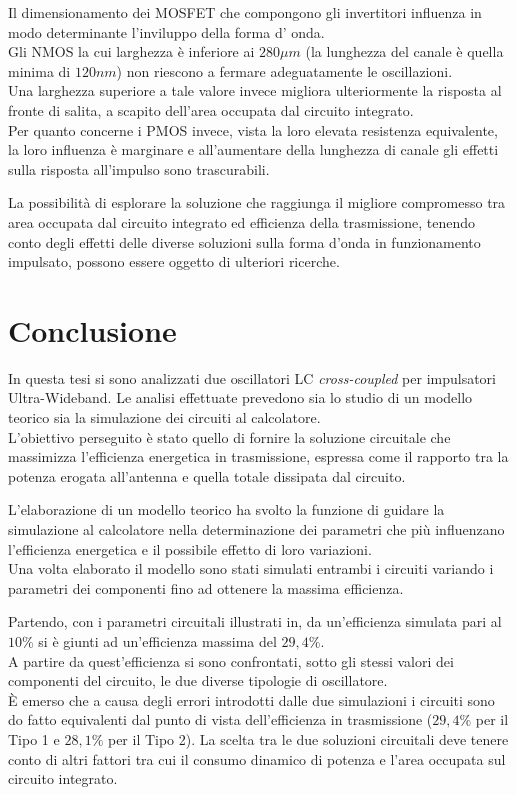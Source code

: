 \documentclass[a4paper, 12pt]{memoir}
\begin{document}
Il dimensionamento dei MOSFET che compongono gli invertitori influenza in modo
determinante l'inviluppo della forma d' onda.\\
Gli NMOS la cui larghezza è inferiore ai $280 \mu m$ (la lunghezza del canale è
quella minima di $120nm$) non riescono a fermare adeguatamente le oscillazioni.
\\Una larghezza superiore a tale valore invece migliora ulteriormente la
risposta al fronte di salita, a scapito dell'area occupata dal circuito
integrato.\\
Per quanto concerne i PMOS invece, vista la loro elevata resistenza
equivalente, la loro influenza è marginare e all'aumentare della lunghezza di
canale gli effetti sulla risposta all'impulso sono trascurabili.

La possibilità di esplorare la soluzione che raggiunga il migliore compromesso
tra area occupata dal circuito integrato ed efficienza della trasmissione,
tenendo conto degli effetti delle diverse soluzioni sulla forma d'onda in
funzionamento impulsato, possono essere oggetto di ulteriori ricerche.

\chapter{Conclusione}
In questa tesi si sono analizzati due oscillatori LC \emph{cross-coupled} per
impulsatori Ultra-Wideband. Le analisi effettuate prevedono sia lo studio di un
modello teorico sia la simulazione dei circuiti al calcolatore.\\
L'obiettivo perseguito è stato quello di fornire la soluzione circuitale che
massimizza l'efficienza energetica in trasmissione, espressa come il rapporto
tra la potenza erogata all'antenna e quella totale dissipata dal circuito.

L'elaborazione di un modello teorico ha svolto la funzione di guidare la
simulazione al calcolatore nella determinazione dei parametri che più
influenzano l'efficienza energetica e il possibile effetto di loro variazioni.\\
Una volta elaborato il modello sono stati simulati entrambi i circuiti variando
i parametri dei componenti fino ad ottenere la massima efficienza.

Partendo, con i parametri circuitali illustrati in\cite{Neviani14}, da 
un'efficienza simulata pari al $10\%$ si è giunti ad un'efficienza massima del
$29,4\%$.\\
A partire da quest'efficienza si sono confrontati, sotto gli stessi valori dei
componenti del circuito, le due diverse tipologie di oscillatore.\\
\`E emerso che a causa degli errori introdotti dalle due simulazioni i circuiti
sono do fatto equivalenti dal punto di vista dell'efficienza in trasmissione
($29,4\%$ per il Tipo 1 e $28,1\%$ per il Tipo 2). La scelta tra le due
soluzioni circuitali deve tenere conto di altri fattori tra cui il consumo
dinamico di potenza e l'area occupata sul circuito integrato.
\end{document}
